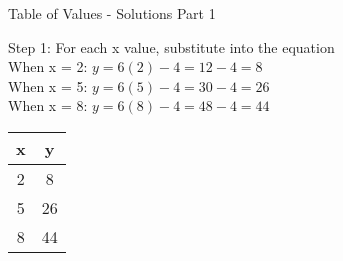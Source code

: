 \documentclass[aspectratio=169]{beamer}
\begin{document}
\begin{frame}{Table of Values - Solutions Part 1}
    \begin{tcolorbox}[colback=lightgray,colframe=accent,title=Solution for $y = 6x - 4$]
        \footnotesize
        Step 1: For each x value, substitute into the equation \\
        When x = 2: $y = 6(2) - 4 = 12 - 4 = 8$ \\
        When x = 5: $y = 6(5) - 4 = 30 - 4 = 26$ \\
        When x = 8: $y = 6(8) - 4 = 48 - 4 = 44$
        \vspace*{-1.5em}
        \begin{center}
        \begin{tabular}{|c|c|}
            \hline
            \rowcolor{primary!20} x & y \\
            \hline
            2 & 8 \\
            5 & 26 \\
            8 & 44 \\
            \hline
        \end{tabular}
        \end{center}
    \end{tcolorbox}
    \vfill
\end{frame}
\end{document}
